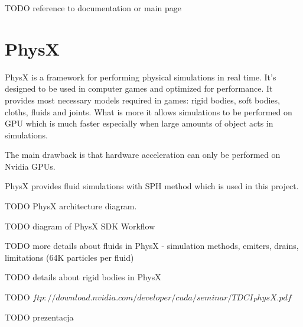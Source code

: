 TODO reference to documentation or main page

\section{PhysX}

PhysX is a framework for performing physical simulations in real time. It's designed to be used in computer games and optimized for performance. It provides most necessary models required in games: rigid bodies, soft bodies, cloths, fluids and joints. What is more it allows simulations to be performed on GPU which is much faster especially when large amounts of object acts in simulations.

The main drawback is that hardware acceleration can only be performed on Nvidia GPUs. 

PhysX provides fluid simulations with SPH method which is used in this project. 

TODO PhysX architecture diagram.

TODO diagram of PhysX SDK Workflow

TODO more details about fluids in PhysX - simulation methods, emiters, drains, limitations (64K particles per fluid)

TODO details about rigid bodies in PhysX

TODO $ftp://download.nvidia.com/developer/cuda/seminar/TDCI_PhysX.pdf$

TODO prezentacja



